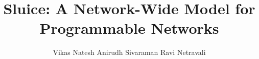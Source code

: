 \documentclass[sigconf]{acmart}
\begin{document}
\title{	Sluice: A Network-Wide Model for Programmable Networks}


\author{Vikas Natesh Anirudh Sivaraman Ravi Netravali}

\renewcommand{\shortauthors}{V. Natesh.et al.}


\maketitle





\end{document}
